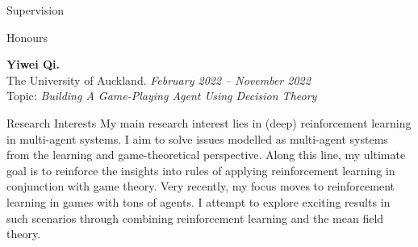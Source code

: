 \documentclass{resume} %
\begin{document}

\begin{rSection}{Supervision}
	\begin{rSubsection}{Honours}{}{}{}
		\item {\bf Yiwei Qi.}\\ The University of Auckland. \hfill {\em February 2022 -- November 2022} \\Topic: {\em Building A Game-Playing Agent Using Decision Theory}
	\end{rSubsection}
\end{rSection}

\begin{rSection}{Research Interests}
My main research interest lies in (deep) reinforcement learning in multi-agent systems. I aim to solve issues modelled as multi-agent systems from the learning and game-theoretical perspective. Along this line, my ultimate goal is to reinforce the insights into rules of applying reinforcement learning in conjunction with game theory. Very recently, my focus moves to reinforcement learning in games with tons of agents. I attempt to explore exciting results in such scenarios through combining reinforcement learning and the mean field theory.
\end{rSection}
\end{document}
